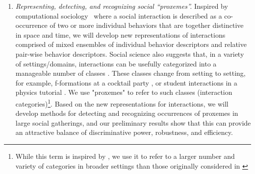 \begin{enumerate}


\vspace{-0.1in}\item \emph{Representing, detecting, and recognizing social ``proxemes''.} Inspired by computational sociology~\cite{hall1974,Kendon1990,Lazer2009,Pantic} where a social interaction is described as a co-occurrence of two or more individual behaviors that are together distinctive in space and time, we will develop new representations of interactions comprised of mixed ensembles of individual behavior descriptors and relative pair-wise behavior descriptors.  Social science also suggests that, in a variety of settings/domains, interactions can be usefully categorized into a manageable number of classes \cite{hall1974,Kendon1990,Hoyle,Tannen,econo_category,Scherr2009}. These classes change from setting to setting, for example, f-formations at a cocktail party \cite{Kendon1990}, or student interactions in a physics tutorial \cite{Scherr2009}. We use "proxemes" to refer to such classes (interaction categories)\footnote{While this term is inspired by \cite{hall1974}, we use it to refer to a larger number and variety of categories in broader settings than those originally considered in \cite{hall1974}}. Based on the new representations for interactions, we will develop methods for detecting and recognizing occurrences of proxemes in large social gatherings, and our preliminary results show that this can provide an attractive balance of discriminative power, robustness, and efficiency.





\end{enumerate}
